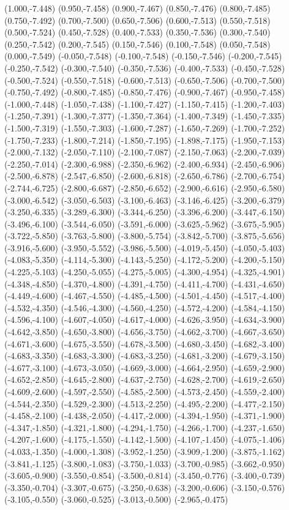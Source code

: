 (1.000,-7.448) (0.950,-7.458) (0.900,-7.467) (0.850,-7.476) (0.800,-7.485) (0.750,-7.492) (0.700,-7.500) (0.650,-7.506) (0.600,-7.513) (0.550,-7.518) (0.500,-7.524) (0.450,-7.528) (0.400,-7.533) (0.350,-7.536) (0.300,-7.540) (0.250,-7.542) (0.200,-7.545) (0.150,-7.546) (0.100,-7.548) (0.050,-7.548) (0.000,-7.549) (-0.050,-7.548) (-0.100,-7.548) (-0.150,-7.546) (-0.200,-7.545) (-0.250,-7.542) (-0.300,-7.540) (-0.350,-7.536) (-0.400,-7.533) (-0.450,-7.528) (-0.500,-7.524) (-0.550,-7.518) (-0.600,-7.513) (-0.650,-7.506) (-0.700,-7.500) (-0.750,-7.492) (-0.800,-7.485) (-0.850,-7.476) (-0.900,-7.467) (-0.950,-7.458) (-1.000,-7.448) (-1.050,-7.438) (-1.100,-7.427) (-1.150,-7.415) (-1.200,-7.403) (-1.250,-7.391) (-1.300,-7.377) (-1.350,-7.364) (-1.400,-7.349) (-1.450,-7.335) (-1.500,-7.319) (-1.550,-7.303) (-1.600,-7.287) (-1.650,-7.269) (-1.700,-7.252) (-1.750,-7.233) (-1.800,-7.214) (-1.850,-7.195) (-1.898,-7.175) (-1.950,-7.153) (-2.000,-7.132) (-2.050,-7.110) (-2.100,-7.087) (-2.150,-7.063) (-2.200,-7.039) (-2.250,-7.014) (-2.300,-6.988) (-2.350,-6.962) (-2.400,-6.934) (-2.450,-6.906) (-2.500,-6.878) (-2.547,-6.850) (-2.600,-6.818) (-2.650,-6.786) (-2.700,-6.754) (-2.744,-6.725) (-2.800,-6.687) (-2.850,-6.652) (-2.900,-6.616) (-2.950,-6.580) (-3.000,-6.542) (-3.050,-6.503) (-3.100,-6.463) (-3.146,-6.425) (-3.200,-6.379) (-3.250,-6.335) (-3.289,-6.300) (-3.344,-6.250) (-3.396,-6.200) (-3.447,-6.150) (-3.496,-6.100) (-3.544,-6.050) (-3.591,-6.000) (-3.625,-5.962) (-3.675,-5.905) (-3.722,-5.850) (-3.763,-5.800) (-3.800,-5.754) (-3.842,-5.700) (-3.875,-5.656) (-3.916,-5.600) (-3.950,-5.552) (-3.986,-5.500) (-4.019,-5.450) (-4.050,-5.403) (-4.083,-5.350) (-4.114,-5.300) (-4.143,-5.250) (-4.172,-5.200) (-4.200,-5.150) (-4.225,-5.103) (-4.250,-5.055) (-4.275,-5.005) (-4.300,-4.954) (-4.325,-4.901) (-4.348,-4.850) (-4.370,-4.800) (-4.391,-4.750) (-4.411,-4.700) (-4.431,-4.650) (-4.449,-4.600) (-4.467,-4.550) (-4.485,-4.500) (-4.501,-4.450) (-4.517,-4.400) (-4.532,-4.350) (-4.546,-4.300) (-4.560,-4.250) (-4.572,-4.200) (-4.584,-4.150) (-4.596,-4.100) (-4.607,-4.050) (-4.617,-4.000) (-4.626,-3.950) (-4.634,-3.900) (-4.642,-3.850) (-4.650,-3.800) (-4.656,-3.750) (-4.662,-3.700) (-4.667,-3.650) (-4.671,-3.600) (-4.675,-3.550) (-4.678,-3.500) (-4.680,-3.450) (-4.682,-3.400) (-4.683,-3.350) (-4.683,-3.300) (-4.683,-3.250) (-4.681,-3.200) (-4.679,-3.150) (-4.677,-3.100) (-4.673,-3.050) (-4.669,-3.000) (-4.664,-2.950) (-4.659,-2.900) (-4.652,-2.850) (-4.645,-2.800) (-4.637,-2.750) (-4.628,-2.700) (-4.619,-2.650) (-4.609,-2.600) (-4.597,-2.550) (-4.585,-2.500) (-4.573,-2.450) (-4.559,-2.400) (-4.544,-2.350) (-4.529,-2.300) (-4.513,-2.250) (-4.495,-2.200) (-4.477,-2.150) (-4.458,-2.100) (-4.438,-2.050) (-4.417,-2.000) (-4.394,-1.950) (-4.371,-1.900) (-4.347,-1.850) (-4.321,-1.800) (-4.294,-1.750) (-4.266,-1.700) (-4.237,-1.650) (-4.207,-1.600) (-4.175,-1.550) (-4.142,-1.500) (-4.107,-1.450) (-4.075,-1.406) (-4.033,-1.350) (-4.000,-1.308) (-3.952,-1.250) (-3.909,-1.200) (-3.875,-1.162) (-3.841,-1.125) (-3.800,-1.083) (-3.750,-1.033) (-3.700,-0.985) (-3.662,-0.950) (-3.605,-0.900) (-3.550,-0.854) (-3.500,-0.814) (-3.450,-0.776) (-3.400,-0.739) (-3.350,-0.704) (-3.307,-0.675) (-3.250,-0.638) (-3.200,-0.606) (-3.150,-0.576) (-3.105,-0.550) (-3.060,-0.525) (-3.013,-0.500) (-2.965,-0.475) 
